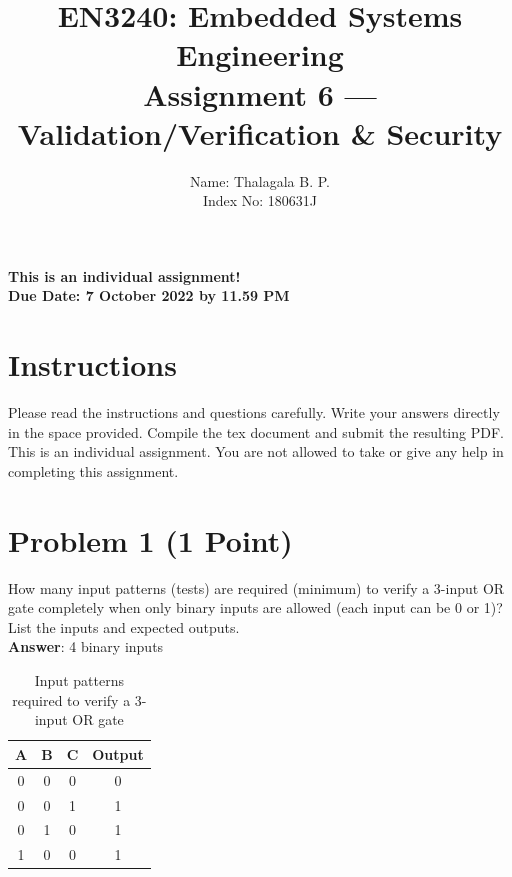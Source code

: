 \documentclass[11pt,letterpaper]{article}
\begin{document}
	
	\title{EN3240: Embedded Systems Engineering \\Assignment 6 --- Validation/Verification \& Security}
	
	\author{Name: Thalagala B. P. \\ Index No: 180631J}
	
	\maketitle
	
	\begin{center}
		\color{red}\bf This is an individual assignment! \\ Due Date: 7 October 2022 by 11.59 PM
	\end{center}
	
	\section*{Instructions}
	
	Please read the instructions and questions carefully. Write your answers directly in the space provided. Compile the tex document and submit the resulting PDF. This is an individual assignment. You are not allowed to take or give any help in completing this assignment.
	
	\newpage
	
	\section*{Problem 1 (1 Point)}
	
	How many input patterns (tests) are required (minimum) to verify a 3-input OR gate completely when only binary inputs are allowed (each input can be 0 or 1)? List the inputs and expected outputs.\\
	
	\textbf{\Large Answer}: 4 binary inputs
	
	\begin{table}[H]
		\centering
		\begin{tabular}{|c |c | c | c|}
			\hline
			A & B & C & Output\\ \hline
			0 & 0 & 0 & 0 \\ \hline
			0 & 0 & 1 & 1 \\ \hline
			0 & 1 & 0 & 1 \\ \hline
			1 & 0 & 0 & 1 \\ \hline
		\end{tabular}
	\caption{Input patterns required to verify a 3-input OR gate}
	\end{table}
	
\end{document}
